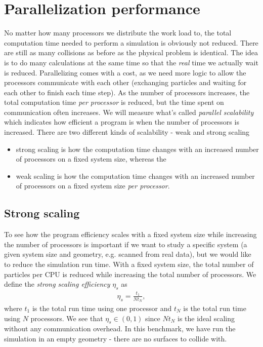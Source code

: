 \section{Parallelization performance}
\label{sec:dsmc_parallelization_performance}
No matter how many processors we distribute the work load to, the total computation time needed to perform a simulation is obviously not reduced. There are still as many collisions as before as the physical problem is identical. The idea is to do many calculations at the same time so that the \textit{real} time we actually wait is reduced. Parallelizing comes with a cost, as we need more logic to allow the processors communicate with each other (exchanging particles and waiting for each other to finish each time step). As the number of processors increases, the total computation time \textit{per processor} is reduced, but the time spent on communication often increases. We will measure what's called \textit{parallel scalability} which indicates how efficient a program is when the number of processors is increased. There are two different kinds of scalability - weak and strong scaling
\begin{itemize}
	\item strong scaling is how the computation time changes with an increased number of processors on a fixed system size, whereas the
	\item weak scaling is how the computation time changes with an increased number of processors on a fixed system size \textit{per processor}.
\end{itemize}
\subsection{Strong scaling}
To see how the program efficiency scales with a fixed system size while increasing the number of processors is important if we want to study a specific system (a given system size and geometry, e.g. scanned from real data), but we would like to reduce the simulation run time. With a fixed system size, the total number of particles per CPU is reduced while increasing the total number of processors. We define the \textit{strong scaling efficiency} $\eta_s$ as
\begin{align}
	\eta_s = \frac{t_1}{Nt_N},
\end{align}
where $t_1$ is the total run time using one processor and $t_N$ is the total run time using $N$ processors. We see that $\eta_s\in (0,1)$ since $Nt_N$ is the ideal scaling without any communication overhead. In this benchmark, we have run the simulation in an empty geometry - there are no surfaces to collide with.

